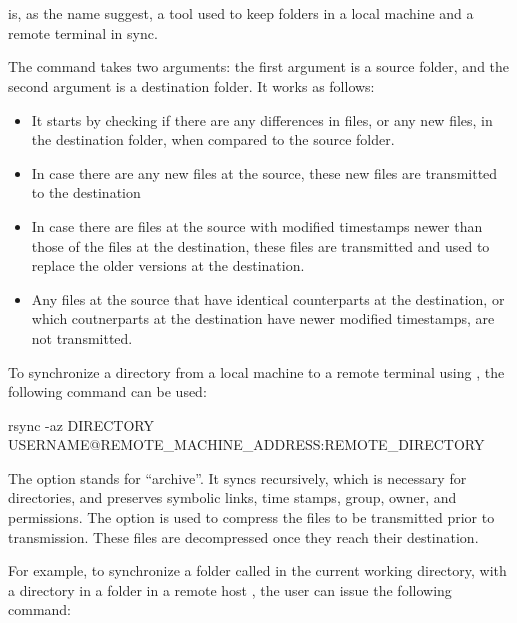 \section{}

 is, as the name suggest, a tool used to keep folders in a local machine and a remote terminal in sync. 

The  command takes two arguments: the first argument is a source folder, and the second argument is a destination folder. It works as follows:
\begin{itemize}
\item It starts by checking if there are any differences in files, or any new files, in the destination folder, when compared to the source folder.
\item In case there are any new files at the source, these new files are transmitted to the destination
\item In case there are files at the source with modified timestamps newer than those of the files at the destination, these files are transmitted and used to replace the older versions at the destination.
\item Any files at the source that have identical counterparts at the destination, or which coutnerparts at the destination have newer modified timestamps, are not transmitted.
\end{itemize}

To synchronize a directory from a local machine to a remote terminal using , the following command can be used:
\begin{command_line}[make]
  rsync -az DIRECTORY USERNAME@REMOTE_MACHINE_ADDRESS:REMOTE_DIRECTORY
\end{command_line}

The  option stands for ``archive''. It syncs recursively, which is necessary for directories, and preserves symbolic links, time stamps, group, owner, and permissions. The  option is used to compress the files to be transmitted prior to transmission. These files are decompressed once they reach their  destination.

For example, to synchronize a folder called  in the current working directory, with a directory  in a folder  in a remote host , the user  can issue the following command:

